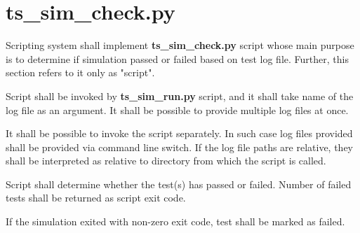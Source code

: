 \documentclass{tropic_design_spec}
\begin{document}

\ReqEnd



\pagebreak

\section{ts_sim_check.py}



    {Scripting system shall implement \textbf{ts_sim_check.py} script whose main purpose
     is to determine if simulation passed or failed based on test log file. Further, this
     section refers to it only as "script".}


    {Script shall be invoked by \textbf{ts_sim_run.py} script, and it shall take name of
     the log file as an argument. It shall be possible to provide multiple log files
     at once.}


    {It shall be possible to invoke the script separately. In such case log files provided
     shall be provided via command line switch. If the log file paths are relative, they
     shall be interpreted as relative to directory from which the script is called.}


    {Script shall determine whether the test(s) has passed or failed. Number of failed
     tests shall be returned as script exit code.}


    {If the simulation exited with non-zero exit code, test shall be marked as failed.}

\end{document}
